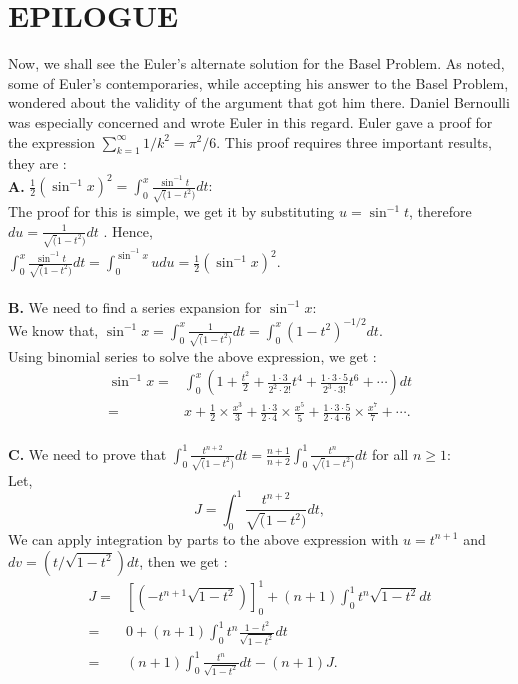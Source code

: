 \documentclass[a4paper,reqno,11pt]{book}
\theoremstyle{plain}%
\theoremstyle{definition}
\begin{document}
\section{EPILOGUE}
Now, we shall see the Euler's alternate solution for the Basel Problem. As noted, some of Euler's contemporaries, while accepting his answer 
to the Basel Problem, wondered about the validity of the argument that got 
him there. Daniel Bernoulli was especially concerned and wrote Euler in this 
regard.\cite{ref 2}
Euler gave a proof for the expression $\sum_{k=1}^{\infty}1/k^2 = \pi^2/6.$
This proof requires three important results, they are :\\
\textbf{A.} $\frac{1}{2}(\sin^{-1}x)^2 = \int_{0}^{x} \frac{\sin^{-1}t}{\sqrt(1-t^2)}dt :$\\
The proof for this is simple, we get it by substituting $u = \sin^{-1}t$, therefore $du = \frac{1}{\sqrt(1-t^2)}dt$ . Hence,\\
$\int_{0}^{x} \frac{\sin^{-1}t}{\sqrt(1-t^2)}dt = \int_{0}^{\sin^{-1}x}u du = \frac{1}{2}(\sin^{-1}x)^2. $\\
\\
\textbf{B.} We need to find a series expansion for $\sin^{-1}x:$\\
We know that, $\sin^{-1}x = \int_{0}^{x} \frac{1}{\sqrt(1-t^2)} dt = \int_{0}^{x} (1-t^2)^{-1/2} dt.  $\\
Using binomial series to solve the above expression, we get :\\
\begin{align*}
\sin^{-1}x =& \int_{0}^{x} \left(1 + \frac{t^2}{2} + \frac{1\cdot3}{2^2\cdot2!}t^4 + \frac{1\cdot3\cdot5}{2^3\cdot3!}t^6 + \cdots\right)dt \\
=& x + \frac{1}{2} \times \frac{x^3}{3} + \frac{1\cdot3}{2\cdot4} \times \frac{x^5}{5} + \frac{1\cdot3\cdot5}{2\cdot4\cdot6} \times \frac{x^7}{7} + \cdots.
\end{align*}
\\
\textbf{C.} We need to prove that $\int_{0}^{1} \frac{t^{n+2}}{\sqrt(1-t^2)}dt = \frac{n+1}{n+2}\int_{0}^{1}\frac{t^{n}}{\sqrt(1-t^2)}dt$ for all $n \geq 1 :$ \\
Let, $$J = \int_{0}^{1} \frac{t^{n+2}}{\sqrt(1-t^2)}dt,$$
We can apply integration by parts to the above expression with $u = t^{n+1}$ and $dv = (t/\sqrt{1-t^2})dt$, then we get :\\
\begin{align*}
J =& \left[(-t^{n+1}\sqrt{1-t^2})\right]_0^{1} + (n+1)\int_{0}^{1} t^{n}\sqrt{1-t^2} dt\\
=& 0 + (n+1)\int_{0}^{1} t^{n}\frac{1-t^2}{\sqrt{1-t^2}} dt\\
=& (n+1)\int_{0}^{1} \frac{t^{n}}{\sqrt{1-t^2}} dt - (n+1)J.
\end{align*}
\end{document}
